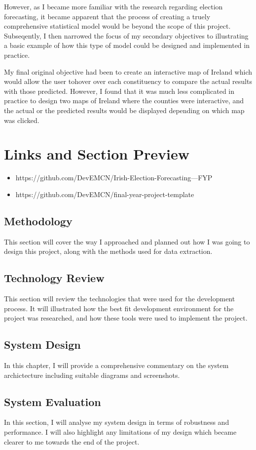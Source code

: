 However, as I became more familiar with the research regarding election forecasting, it became apparent that the process of creating a truely comprehensive statistical model would be beyond the scope of this project.  Subseqently, I then narrowed the focus of my secondary objectives to illustrating a basic example of how this type of model could be designed and implemented in practice. 

My final original objective had been to create an interactive map of Ireland which would allow the user tohover over each constituency to compare the actual results with those predicted.  However, I  found that it was much less complicated in practice to design two maps of Ireland where the counties were interactive, and the actual or the predicted results would be displayed depending on which map was clicked. 

\section{Links and Section Preview}
\begin{itemize}
	\item https://github.com/DevEMCN/Irish-Election-Forecasting---FYP
	\item https://github.com/DevEMCN/final-year-project-template
\end{itemize}
\subsection{Methodology}
This section will cover the way I approached and planned out how I was going to design this project, along with the methods used for data extraction. 
\subsection{Technology Review}
This section will review the technologies that were used for the development process. It will illustrated how the best fit development environment for the project was researched, and how these tools were used to implement the project.
\subsection{System Design}
In this chapter, I will provide a comprehensive commentary on the system archictecture including suitable diagrams and screenshots. 
\subsection{System Evaluation}
In this section, I will analyse my system design in terms of robustness and performance. I will also highlight any limitations of my design which became clearer to me towards the end of the project. 

